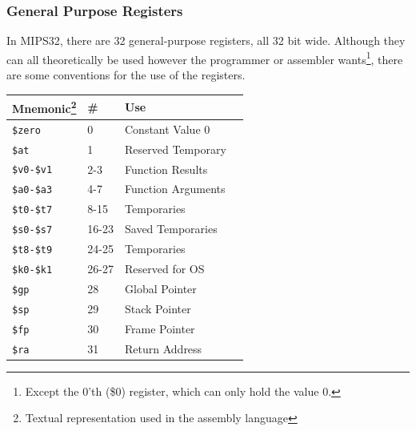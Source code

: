 \subsubsection{General Purpose Registers}
In MIPS32, there are 32 general-purpose registers, all 32 bit wide. Although
they
can all theoretically be used however the programmer or assembler
wants\footnote{Except the 0'th (\$0) register, which can only hold the
value 0.}, there
are some conventions for the use of the registers.
\begin{center}
    \begin{tabular}{ | l | l | l | c |}
    \hline
	\textbf{Mnemonic\footnote{Textual representation used in the assembly language}}%
		 & \textbf{\#} & \textbf{Use} \\ \hline \hline
	\texttt{\$zero}		& 0	& Constant Value 0 \\ \hline
	\texttt{\$at}		& 1	& Reserved Temporary \\ \hline
	\texttt{\$v0-\$v1}	& 2-3	& Function Results \\ \hline
	\texttt{\$a0-\$a3}	& 4-7	& Function Arguments \\ \hline
	\texttt{\$t0-\$t7}	& 8-15	& Temporaries  \\ \hline
	\texttt{\$s0-\$s7}	& 16-23 & Saved Temporaries \\ \hline
	\texttt{\$t8-\$t9}	& 24-25 & Temporaries \\ \hline
	\texttt{\$k0-\$k1}	& 26-27 & Reserved for OS \\ \hline
	\texttt{\$gp}		& 28	& Global Pointer \\ \hline
	\texttt{\$sp}		& 29	& Stack Pointer \\ \hline
	\texttt{\$fp}		& 30	& Frame Pointer \\ \hline
	\texttt{\$ra}		& 31	& Return Address \\ \hline
    \end{tabular}
\end{center}

